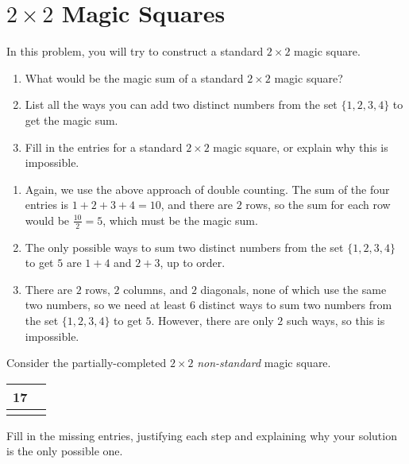 \documentclass[11pt]{article}
\renewenvironment{problem}{\begin{problems}}{\end{problems}\vspace{5pt}}
\begin{document}
\section{$2 \times 2$ Magic Squares}

\begin{problem}[6=2+2+2 points]
In this problem, you will try to construct a standard $2 \times 2$ magic square.
\begin{enumerate}[label=(\alph*)]
\item What would be the magic sum of a standard $2 \times 2$ magic square?

\item List all the ways you can add two distinct numbers from the set $\{1, 2, 3, 4\}$ to get the magic sum.

\item Fill in the entries for a standard $2 \times 2$ magic square, or explain why this is impossible.
\end{enumerate}
\end{problem}

\begin{solution}
\begin{enumerate}[label=(\alph*)]
\item Again, we use the above approach of double counting. The sum of the four entries is $1+2+3+4=10$, and 
there are $2$ rows, so the sum for each row would be $\frac{10}{2} = \boxed{5}$, which must be the magic sum.

\item The only possible ways to sum two distinct numbers from the set $\{1, 2, 3, 4\}$ to get $5$ are
$\boxed{1+4}$ and $\boxed{2+3}$, up to order.

\item There are $2$ rows, $2$ columns, and $2$ diagonals, none of which use the same two numbers, so we
need at least $6$ distinct ways to sum two numbers from the set $\{1, 2, 3, 4\}$ to get $5$. However,
there are only $2$ such ways, so this is impossible.
\end{enumerate}
\end{solution}


\begin{problem}[4 points]
Consider the partially-completed $2 \times 2$ \textit{non-standard} magic square.
\begin{center}
\begin{tabular}{|c|c|}
\hline
17 & \phantom{17} \\ \hline
 & \\ \hline
\end{tabular}
\end{center}
Fill in the missing entries, justifying each step and explaining why your solution is the only possible one.
\end{problem}
\end{document}
